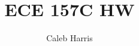 \documentclass[12pt, oneside]{report}
\title{ECE 157C HW \review}
\author{Caleb Harris}
\date{}
\begin{document}


\review
\end{document}

